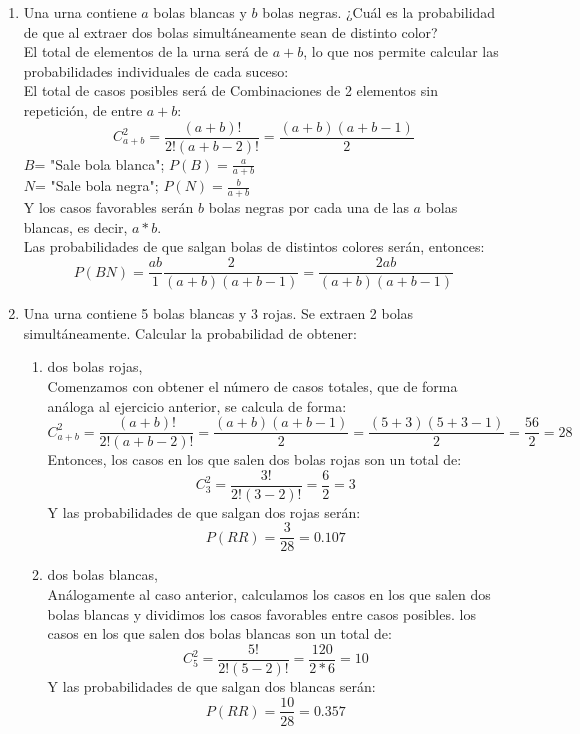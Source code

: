 \documentclass[a4paper,12pt]{article}
\begin{document}
\begin{enumerate}
\begin{enumerate}[label=\alph*)]
{{    La probabilidad de que ocurra alguno será: $$P(A\cup B)= P(A)+P(B)-P(A\cap B)= 0.6 + 0.4 - 0.3 = 0.7$$
    
    \end{enumerate}
    
\item Una urna contiene \(a\) bolas blancas y \(b\) bolas negras. ¿Cuál es la probabilidad de que al extraer dos bolas simultáneamente sean de distinto color?\\
    El total de elementos de la urna será de $a+b$, lo que nos permite calcular las probabilidades individuales de cada suceso:\\
    El total de casos posibles será de Combinaciones de 2 elementos sin repetición, de entre $a+b$:
    $$C^2_{a+b}=\frac{(a+b)!}{2!(a+b-2)!}=\frac{(a+b)(a+b-1)}{2}$$
    $B$= "Sale bola blanca"; $P(B)= \frac{a}{a+b}$\\
    $N$= "Sale bola negra"; $P(N)= \frac{b}{a+b}$\\
    Y los casos favorables serán $b$ bolas negras por cada una de las $a$ bolas blancas, es decir, $a*b$.\\
    Las probabilidades de que salgan bolas de distintos colores serán, entonces:\\
    $$P(BN)=\frac{ab}{1}\frac{2}{(a+b)(a+b-1)}=\frac{2ab}{(a+b)(a+b-1)}$$
    
\item Una urna contiene 5 bolas blancas y 3 rojas. Se extraen 2 bolas simultáneamente. Calcular la probabilidad de obtener:
    \begin{enumerate}[label=\alph*)]
    \item dos bolas rojas,\\
    Comenzamos con obtener el número de casos totales, que de forma análoga al ejercicio anterior, se calcula de forma:
    $$C^2_{a+b}=\frac{(a+b)!}{2!(a+b-2)!}=\frac{(a+b)(a+b-1)}{2}=\frac{(5+3)(5+3-1)}{2}=\frac{56}{2}=28$$
    Entonces, los casos en los que salen dos bolas rojas son un total de:
    $$C^2_3=\frac{3!}{2!(3-2)!}=\frac{6}{2}=3$$
    Y las probabilidades de que salgan dos rojas serán:
    $$P(RR)=\frac{3}{28}=0.107$$
    
    \item dos bolas blancas,\\
    Análogamente al caso anterior, calculamos los casos en los que salen dos bolas blancas y dividimos los casos favorables entre casos posibles. los casos en los que salen dos bolas blancas son un total de:
    $$C^2_5=\frac{5!}{2!(5-2)!}=\frac{120}{2*6}=10$$
    Y las probabilidades de que salgan dos blancas serán:
    $$P(RR)=\frac{10}{28}=0.357$$
    

\end{enumerate}
\end{enumerate}
\end{document}
